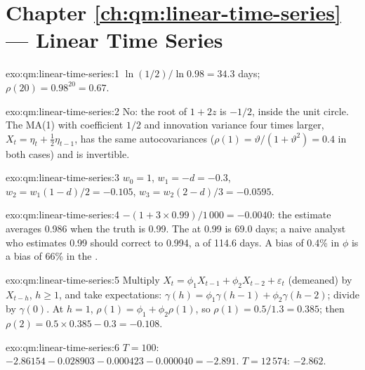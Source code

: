 \section*{Chapter \ref{ch:qm:linear-time-series} --- Linear Time Series}

\begin{solution}{exo:qm:linear-time-series:1}
 $\ln(1/2)/\ln0.98 = 34.3$ days; $\rho(20) = 0.98^{20} = 0.67$.
\end{solution}

\begin{solution}{exo:qm:linear-time-series:2}
No: the root of $1 + 2z$ is $-1/2$, inside the unit circle. The MA(1) with coefficient $1/2$ and innovation variance four times larger, $X_t = \eta_t +
\frac12\eta_{t-1}$, has the same autocovariances ($\rho(1) = \vartheta/(1 + \vartheta^2) = 0.4$ in both cases) and is invertible.
\end{solution}

\begin{solution}{exo:qm:linear-time-series:3}
$w_0 = 1$, $w_1 = -d = -0.3$, $w_2 = w_1(1 - d)/2 = -0.105$, $w_3 = w_2(2 - d)/3 = -0.0595$.
\end{solution}

\begin{solution}{exo:qm:linear-time-series:4}
$-(1 + 3 \times 0.99)/1\,000 = -0.0040$: the estimate averages 0.986 when the truth is 0.99. The  at 0.99 is 69.0 days; a naive analyst who
estimates 0.99 should correct to 0.994, a  of 114.6 days. A bias of 0.4\% in $\phi$ is a bias of 66\% in the .
\end{solution}

\begin{solution}{exo:qm:linear-time-series:5}
Multiply $X_t = \phi_1X_{t-1} + \phi_2X_{t-2} + \varepsilon_t$ (demeaned) by $X_{t-h}$, $h \ge 1$, and take expectations: $\gamma(h) = \phi_1\gamma(h - 1) + \phi_2\gamma(h - 2)$;
divide by $\gamma(0)$. At $h = 1$, $\rho(1) = \phi_1 + \phi_2\rho(1)$, so $\rho(1) = 0.5/1.3 = 0.385$; then $\rho(2) = 0.5 \times 0.385 - 0.3 = -0.108$.
\end{solution}

\begin{solution}{exo:qm:linear-time-series:6}
$T = 100$: $-2.86154 - 0.028903 - 0.000423 - 0.000040 = -2.891$. $T = 12\,574$: $-2.862$.
\end{solution}


